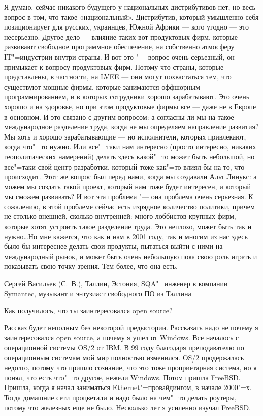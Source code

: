 \documentclass[10pt, a5paper]{article}
\begin{document}
Я думаю, сейчас никакого будущего у национальных дистрибутивов нет, но весь вопрос в том, что такое «национальный». Дистрибутив, который умышленно себя позиционирует для русских, украинцев, Южной Африки — кого угодно — это несерьезно. Другое дело — влияние таких вот продуктовых фирм, которые развивают свободное программное обеспечение, на собственно атмосферу IT"=индустрии внутри страны. И вот это "--- вопрос очень серьезный, он примыкает к вопросу продуктовых фирм. Потому что страны, которые представлены, в частности, на LVEE — они могут похвастаться тем, что существуют мощные фирмы, которые занимаются оффшорным программированием, и в которых сотрудники хорошо зарабатывают. Это очень хорошо и на здоровье, но при этом  продуктовые фирмы все — даже не в Европе в основном. И это связано с другим вопросом: а согласны ли мы на такое международное разделение труда, когда не мы определяем направление развития? Мы хоть и хорошо зарабатывающие — но исполнители, которых привлекают, когда что"=то нужно. Или все"=таки нам интересно (просто интересно, никаких геополитических намерений) делать здесь какой"=то может быть небольшой, но все"=таки свой центр разработки, который тоже как"=то влиял бы на то, что происходит. Этот же вопрос был перед нами, когда мы создавали Альт Линукс: а можем мы создать такой проект, который нам тоже будет интересен, и который мы сможем развивать? И вот эта проблема "--- она проблема очень серьезная. К сожалению, в этой проблеме сейчас есть изрядное количество политики, причем не столько внешней, сколько внутренней: много лоббистов крупных фирм, которые хотят устроить такое разделение труда. Это неплохо, может быть так и нужно\ldots Но мне кажется, что как и нам в 2001 году, так и многим из нас здесь было бы интереснее делать свои продукты, пытаться выйти с ними на международный рынок, и может быть очень небольшую пока свою роль играть и показывать свою точку зрения. Тем более, что она есть. 

\interview Сергей Васильев (С.~В.), Таллин, Эстония, SQA"=инженер в компании Symantec, музыкант и энтузиаст свободного ПО из Таллина

\q Как получилось, что ты заинтересовался open source?

\a Рассказ будет неполным без некоторой предыстории. Рассказать надо не почему я заинтересовался open source, а почему я ушел от Windows. Все началось с операционной системы OS/2 от IBM. В 99 году благодаря преподавателю по операционным системам мой мир полностью изменился. OS/2 продержалась недолго, потому что пришло сознание, что это тоже проприетарная система, но я понял, что есть что"=то другое, нежели Windows. Потом пришла FreeBSD. Пришла, когда я начал заниматься Ethernet"=провайдингом, в начале 2000"=х. Тогда домашние сети процветали и надо было на чем"=то делать роутеры, потому что железных еще не было. Несколько лет я усиленно изучал FreeBSD.
\end{document}
